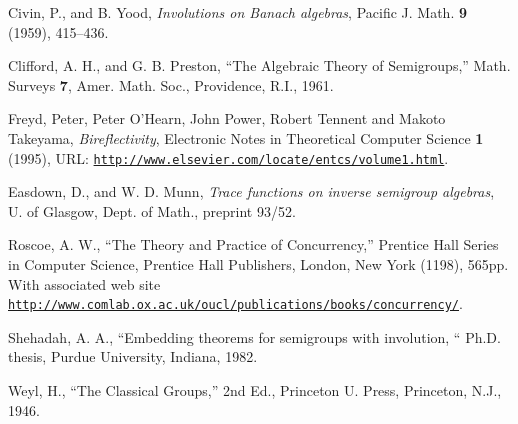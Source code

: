 \documentclass{entcs} \usepackage{entcsmacro}
\begin{document}
\begin{thebibliography}{10}\label{bibliography}
 Civin, P., and B. Yood, \emph{Involutions on Banach
    algebras}, Pacific J. Math. \textbf{9} (1959), 415--436.
  
 Clifford, A. H., and G. B. Preston, ``The Algebraic
  Theory of Semigroups,'' Math. Surveys \textbf{7}, Amer. Math. Soc.,
  Providence, R.I., 1961.
  
 Freyd, Peter, Peter O'Hearn, John Power, Robert Tennent
  and Makoto Takeyama, \emph{Bireflectivity}, Electronic Notes in
  Theoretical Computer Science {\bf 1} (1995), URL:
  \href{http://www.elsevier.com/locate/entcs/volume1.html}
  {\texttt{http://www.elsevier.com/locate/entcs/volume1.html}}.
  
 Easdown, D., and W. D. Munn, \emph{Trace functions on
    inverse semigroup algebras}, U. of Glasgow, Dept. of Math.,
  preprint 93/52.

 Roscoe, A. W., ``The Theory and Practice of Concurrency,''
  Prentice Hall Series in Computer Science, Prentice Hall Publishers,
  London, New York (1198), 565pp. With associated web site\\  
  \href{http://www.comlab.ox.ac.uk/oucl/publications/books/concurrency/}
  {\texttt{http://www.comlab.ox.ac.uk/oucl/publications/books/concurrency/}}.
  
 Shehadah, A. A., ``Embedding theorems for semigroups with
  involution, `` Ph.D.  thesis, Purdue University, Indiana, 1982.
  
 Weyl, H., ``The Classical Groups,'' 2nd Ed., Princeton U.
  Press, Princeton, N.J., 1946.

\end{thebibliography}
\end{document}
